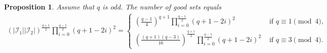 \documentclass[11pt]{article}
\newtheorem{prop}[theorem]{Proposition}
\theoremstyle{definition}
\numberwithin{equation}{section}
\def\cI{\mathcal I}
\begin{document}
\begin{prop}\label{prop:allgoodsetsodd}
Assume that $q$ is odd. The number of good sets equals  
    \begin{align*}
    \left(\lvert \cI_1 \rvert \lvert \cI_2 \rvert\right)^{\frac{q+1}{2}} \prod_{i=0}^{\frac{q-1}{2}} \left(q+1-2i \right)^2=
    \begin{cases} 
    \left(\frac{q-1}{4} \right)^{q+1} \prod\limits_{i=0}^{\frac{q-1}{2}} \left(q+1-2i \right)^2 & \mbox{ if }q \equiv 1 \pmod{4}, \\ 
    \left(\frac{(q+1)(q-3)}{16}\right)^{\frac{q+1}{2}} \prod\limits_{i=0}^{\frac{q-1}{2}} \left(q+1-2i \right)^2 & \mbox{ if } q \equiv 3 \pmod{4}. 
    \end{cases}
    \end{align*}
\end{prop}
\end{document}
